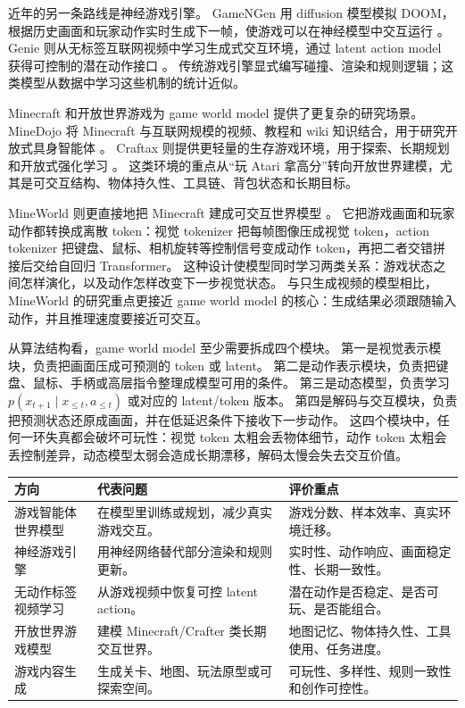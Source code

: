 \documentclass[11pt,a4paper]{ctexart}
\begin{document}
近年的另一条路线是神经游戏引擎。
GameNGen 用 diffusion 模型模拟 DOOM，根据历史画面和玩家动作实时生成下一帧，使游戏可以在神经模型中交互运行 \cite{valevski2024gamengen}。
Genie 则从无标签互联网视频中学习生成式交互环境，通过 latent action model 获得可控制的潜在动作接口 \cite{bruce2024genie}。
传统游戏引擎显式编写碰撞、渲染和规则逻辑；这类模型从数据中学习这些机制的统计近似。

Minecraft 和开放世界游戏为 game world model 提供了更复杂的研究场景。
MineDojo 将 Minecraft 与互联网规模的视频、教程和 wiki 知识结合，用于研究开放式具身智能体 \cite{fan2022minedojo}。
Craftax 则提供更轻量的生存游戏环境，用于探索、长期规划和开放式强化学习 \cite{matthews2024craftax}。
这类环境的重点从“玩 Atari 拿高分”转向开放世界建模，尤其是可交互结构、物体持久性、工具链、背包状态和长期目标。

MineWorld 则更直接地把 Minecraft 建成可交互世界模型 \cite{mineworld2025}。
它把游戏画面和玩家动作都转换成离散 token：视觉 tokenizer 把每帧图像压成视觉 token，action tokenizer 把键盘、鼠标、相机旋转等控制信号变成动作 token，再把二者交错拼接后交给自回归 Transformer。
这种设计使模型同时学习两类关系：游戏状态之间怎样演化，以及动作怎样改变下一步视觉状态。
与只生成视频的模型相比，MineWorld 的研究重点更接近 game world model 的核心：生成结果必须跟随输入动作，并且推理速度要接近可交互。

从算法结构看，game world model 至少需要拆成四个模块。
第一是视觉表示模块，负责把画面压成可预测的 token 或 latent。
第二是动作表示模块，负责把键盘、鼠标、手柄或高层指令整理成模型可用的条件。
第三是动态模型，负责学习 $p(x_{t+1}\mid x_{\le t},a_{\le t})$ 或对应的 latent/token 版本。
第四是解码与交互模块，负责把预测状态还原成画面，并在低延迟条件下接收下一步动作。
这四个模块中，任何一环失真都会破坏可玩性：视觉 token 太粗会丢物体细节，动作 token 太粗会丢控制差异，动态模型太弱会造成长期漂移，解码太慢会失去交互价值。

\begin{longtable}{p{} p{} p{}}
\toprule
方向 & 代表问题 & 评价重点 \\
\midrule
游戏智能体世界模型 & 在模型里训练或规划，减少真实游戏交互。 & 游戏分数、样本效率、真实环境迁移。 \\
神经游戏引擎 & 用神经网络替代部分渲染和规则更新。 & 实时性、动作响应、画面稳定性、长期一致性。 \\
无动作标签视频学习 & 从游戏视频中恢复可控 latent action。 & 潜在动作是否稳定、是否可玩、是否能组合。 \\
开放世界游戏模型 & 建模 Minecraft/Crafter 类长期交互世界。 & 地图记忆、物体持久性、工具使用、任务进度。 \\
游戏内容生成 & 生成关卡、地图、玩法原型或可探索空间。 & 可玩性、多样性、规则一致性和创作可控性。 \\
\bottomrule
\end{longtable}
\end{document}
